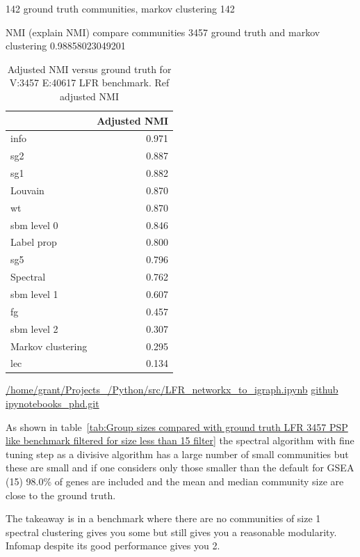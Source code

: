 142 ground truth communities, markov clustering 142

NMI (explain NMI) compare communities 3457 ground truth and markov clustering 0.98858023049201


\begin{table}
\centering
\begin{tabular}{lr}
\toprule
{} &  Adjusted NMI \\
\midrule
info              &         0.971 \\
sg2               &         0.887 \\
sg1               &         0.882 \\
Louvain           &         0.870 \\
wt                &         0.870 \\
sbm level 0       &         0.846 \\
Label prop        &         0.800 \\
sg5               &         0.796 \\
Spectral          &         0.762 \\
sbm level 1       &         0.607 \\
fg                &         0.457 \\
sbm level 2       &         0.307 \\
Markov clustering &         0.295 \\
lec               &         0.134 \\
\bottomrule
\end{tabular}
\caption{Adjusted NMI versus ground truth for V:3457 E:40617 LFR benchmark. Ref adjusted NMI\cite{vinh2010information}}
\tiny\url{/home/grant/Projects_/Python/src/LFR_networkx_to_igraph.ipynb}
\tiny\url{github ipynotebooks_phd.git}
\label{tab:adjusted nmi versus ground truth for 3457 40617 LFR benchmark}
\end{table}


As shown in table~\ref{tab:Group sizes compared with ground truth LFR 3457 PSP like benchmark filtered for size less than 15 filter} the spectral algorithm with fine tuning step as a divisive algorithm has a large number of small communities but these are small and if one considers only those smaller than the default for GSEA (15) 98.0\% of genes are included and the mean and median community size are close to the ground truth. 


The takeaway is in a benchmark where there are no communities of size 1 spectral clustering gives you some but still gives you a reasonable modularity. Infomap despite its good performance gives you 2. 


